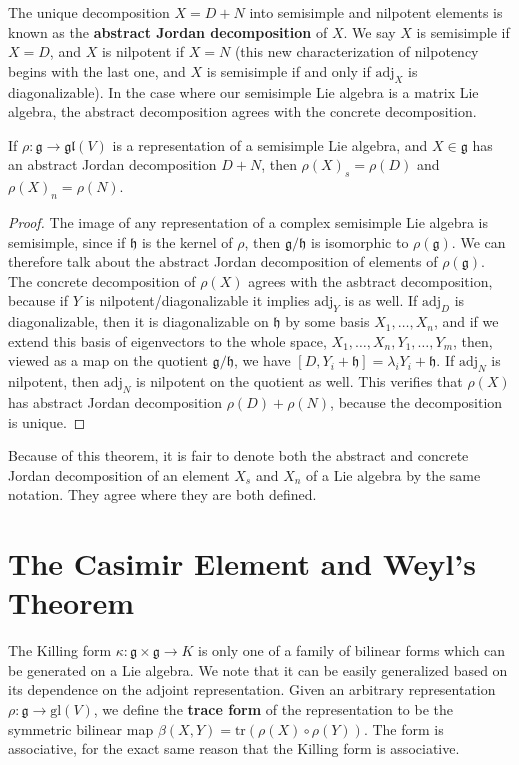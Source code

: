 The unique decomposition $X = D + N$ into semisimple and nilpotent elements is known as the {\bf abstract Jordan decomposition} of $X$. We say $X$ is semisimple if $X = D$, and $X$ is nilpotent if $X = N$ (this new characterization of nilpotency begins with the last one, and $X$ is semisimple if and only if $\text{adj}_X$ is diagonalizable). In the case where our semisimple Lie algebra is a matrix Lie algebra, the abstract decomposition agrees with the concrete decomposition.

\begin{theorem}
    If $\rho: \mathfrak{g} \to \mathfrak{gl}(V)$ is a representation of a semisimple Lie algebra, and $X \in \mathfrak{g}$ has an abstract Jordan decomposition $D + N$, then $\rho(X)_s = \rho(D)$ and $\rho(X)_n = \rho(N)$.
\end{theorem}
\begin{proof}
    The image of any representation of a complex semisimple Lie algebra is semisimple, since if $\mathfrak{h}$ is the kernel of $\rho$, then $\mathfrak{g}/\mathfrak{h}$ is isomorphic to $\rho(\mathfrak{g})$. We can therefore talk about the abstract Jordan decomposition of elements of $\rho(\mathfrak{g})$. The concrete decomposition of $\rho(X)$ agrees with the asbtract decomposition, because if $Y$ is nilpotent/diagonalizable it implies $\text{adj}_Y$ is as well. If $\text{adj}_D$ is diagonalizable, then it is diagonalizable on $\mathfrak{h}$ by some basis $X_1, \dots, X_n$, and if we extend this basis of eigenvectors to the whole space, $X_1, \dots, X_n, Y_1, \dots, Y_m$, then, viewed as a map on the quotient $\mathfrak{g}/\mathfrak{h}$, we have $[D, Y_i + \mathfrak{h}] = \lambda_i Y_i + \mathfrak{h}$. If $\text{adj}_N$ is nilpotent, then $\text{adj}_N$ is nilpotent on the quotient as well. This verifies that $\rho(X)$ has abstract Jordan decomposition $\rho(D) + \rho(N)$, because the decomposition is unique.
\end{proof}

Because of this theorem, it is fair to denote both the abstract and concrete Jordan decomposition of an element $X_s$ and $X_n$ of a Lie algebra by the same notation. They agree where they are both defined.

\section{The Casimir Element and Weyl's Theorem}

The Killing form $\kappa: \mathfrak{g} \times \mathfrak{g} \to K$ is only one of a family of bilinear forms which can be generated on a Lie algebra. We note that it can be easily generalized based on its dependence on the adjoint representation. Given an arbitrary representation $\rho: \mathfrak{g} \to \text{gl}(V)$, we define the {\bf trace form} of the representation to be the symmetric bilinear map $\beta(X,Y) = \text{tr}(\rho(X) \circ \rho(Y))$. The form is associative, for the exact same reason that the Killing form is associative.


